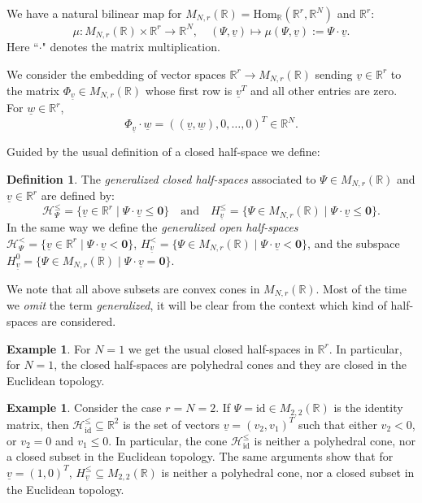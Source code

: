 \documentclass[12pt, a4article]{amsart}   	%
\numberwithin{equation}{section}
\theoremstyle{plain}
\theoremstyle{definition}
\newtheorem{example}[theorem]{Example}
\newtheorem{definition}[theorem]{Definition}
\newcommand{\mcH}{{\mathcal H}}
\newcommand{\uv}{{\underline v}}
\begin{document}
We have a natural  bilinear map for $M_{N,r}(\mathbb R)=\mathrm{Hom}_\mathbb R(\mathbb R^r,\mathbb R^N)$ and $\mathbb R^r$:
$$\mu: M_{N,r}(\mathbb R)  \times\mathbb R^r \rightarrow \mathbb R^N, \quad (\Psi,\uv)\mapsto \mu( \Psi,\uv):=\Psi\cdot\uv.$$
Here ``$\cdot$" denotes the matrix multiplication.

We consider the embedding of vector spaces $\mathbb{R}^r\to M_{N,r}(\mathbb{R})$ sending $\underline{v}\in\mathbb{R}^r$ to the matrix $\Phi_{\underline{v}}\in M_{N,r}(\mathbb{R})$ whose first row is $\underline{v}^T$ and all other entries are zero. For $\underline{w}\in\mathbb{R}^r$, 
\begin{equation}\label{Eq:Phi}
\Phi_{\underline{v}}\cdot \underline{w}=((\underline{v},\underline{w}),0,\ldots,0)^T\in\mathbb{R}^N.
\end{equation}

Guided by the usual definition of a closed half-space we define:

\begin{definition}\label{defn:half-space}\rm
The  \emph{generalized closed half-spaces} associated to $\Psi\in M_{N,r}(\mathbb R)$ and  $\uv\in \mathbb R^r$ are defined by:
$$
\mcH_{ {\Psi}}^\leq=\{\uv\in \mathbb R^r\mid \Psi\cdot\uv\le \mathbf 0\}\quad\textrm{and}\quad
H_{ {\uv}}^\leq =\{\Psi\in M_{N,r}(\mathbb R)\mid \Psi\cdot\uv\le \mathbf 0\}.
$$
In the same way we define the \emph{generalized open half-spaces} $\mcH_{ {\Psi}}^<=\{\uv\in \mathbb R^r\mid \Psi\cdot\uv < \mathbf 0\}$, $H_{{\uv}}^< =\{\Psi\in M_{N,r}(\mathbb R)\mid \Psi\cdot\uv < \mathbf 0\}$, and the subspace $H_{ {\uv}}^0 =\{\Psi\in M_{N,r}(\mathbb R)\mid \Psi\cdot\uv = \mathbf 0\}$.
\end{definition}


We note that all above subsets are convex cones in $M_{N,r}(\mathbb{R})$. Most of the time we \emph{omit} the term  \emph{generalized}, it will be clear from the context which kind of half-spaces are considered.

\begin{example}\label{classical}
For $N=1$ we get the usual closed half-spaces in $\mathbb R^r$. In particular, for $N=1$, the closed half-spaces are  polyhedral cones and they are closed in the Euclidean topology.
\end{example} 

\begin{example}\label{identity1}
Consider the case $r=N=2$. If $\Psi=\mathrm{id} \in M_{2,2}(\mathbb R)$ is the identity matrix, then $\mcH_{\mathrm{id}}^\leq\subseteq \mathbb R^2$ is the set of vectors $\uv=(v_2,v_1)^T$ such that either $v_2<0$, or $v_2=0$ and $v_1\le 0$. In particular, the cone  $\mcH_{\mathrm{id}}^\leq$ is neither a polyhedral cone, nor a closed subset in the Euclidean topology. The same arguments show that for $\underline{v}=(1,0)^T$,  $H_{\underline{v}}^\leq\subseteq  M_{2,2}(\mathbb R)$ is neither a polyhedral cone, nor a closed subset in the Euclidean topology.
\end{example} 
\end{document}
